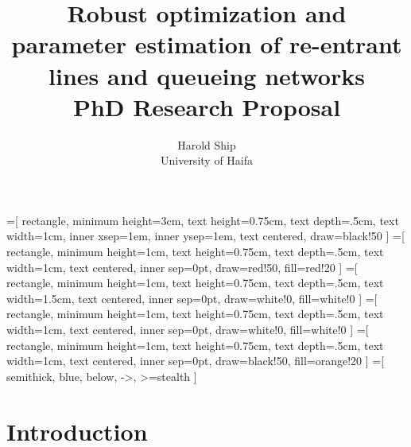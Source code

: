 \documentclass[11pt,a4paper,titlepage]{article}
\title{Robust optimization and parameter estimation of re-entrant lines and
    queueing networks \\ PhD Research Proposal}
\author{Harold Ship \\ University of Haifa}
\theoremstyle{definition}
\begin{document}
=[%
rectangle,
minimum height=3cm,
text height=0.75cm,
text depth=.5cm,
text width=1cm,
inner xsep=1em,
inner ysep=1em,
text centered,
draw=black!50
]
=[%
rectangle,
minimum height=1cm,
text height=0.75cm,
text depth=.5cm,
text width=1cm,
text centered,
inner sep=0pt,
draw=red!50,
fill=red!20
]
=[%
rectangle,
minimum height=1cm,
text height=0.75cm,
text depth=.5cm,
text width=1.5cm,
text centered,
inner sep=0pt,
draw=white!0,
fill=white!0
]
=[%
rectangle,
minimum height=1cm,
text height=0.75cm,
text depth=.5cm,
text width=1cm,
text centered,
inner sep=0pt,
draw=white!0,
fill=white!0
]
=[%
rectangle,
minimum height=1cm,
text height=0.75cm,
text depth=.5cm,
text width=1cm,
text centered,
inner sep=0pt,
draw=black!50,
fill=orange!20
]
=[%
semithick,
blue,
below,
->,
>=stealth
]



\maketitle \clearpage
\tableofcontents \clearpage
\iffalse %
\listoffigures \clearpage
\fi
\iffalse %
\listoftables \clearpage
\fi
\printglossaries \clearpage


\setcounter{page}{1}


\section{Introduction}
\label{sec:introduction}
\end{document}
